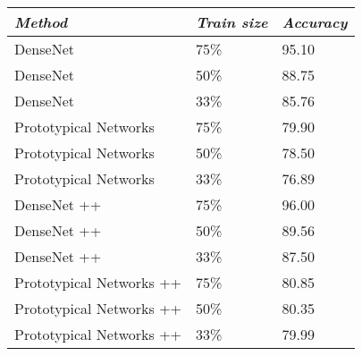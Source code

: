 \begin{table}[h!]
\centering
\begin{tabular}{ p{15em} p{7em} p{8em}}
\toprule
\emph{Method} & \emph{Train size} & \emph{Accuracy} \\ \midrule
DenseNet \cite{densenet} & 75\% & 95.10 \\
DenseNet \cite{densenet} & 50\% & 88.75 \\
DenseNet \cite{densenet} & 33\% & 85.76 \\
Prototypical Networks \cite{protonet} & 75\% & 79.90 \\
Prototypical Networks \cite{protonet} & 50\% & 78.50 \\
Prototypical Networks \cite{protonet} & 33\% & 76.89 \\
DenseNet ++ \cite{densenet} & 75\% & 96.00 \\
DenseNet ++ \cite{densenet} & 50\% & 89.56 \\
DenseNet ++ \cite{densenet} & 33\% & 87.50 \\
Prototypical Networks ++ \cite{protonet} & 75\% & 80.85 \\
Prototypical Networks ++ \cite{protonet} & 50\% & 80.35 \\
Prototypical Networks ++ \cite{protonet} & 33\% & 79.99 \\
\bottomrule
\end{tabular}
\label{tab:results_reduced_rwth}
\end{table}
